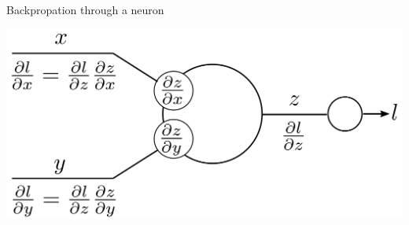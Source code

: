 \documentclass[xcolor=pdftex,dvipsnames,table,mathserif]{beamer}
\begin{document}
\begin{frame}{Backpropation through a neuron}

  \includegraphics[width=\textwidth]{bp_2_1_neuron.png}

\end{frame}
\end{document}

